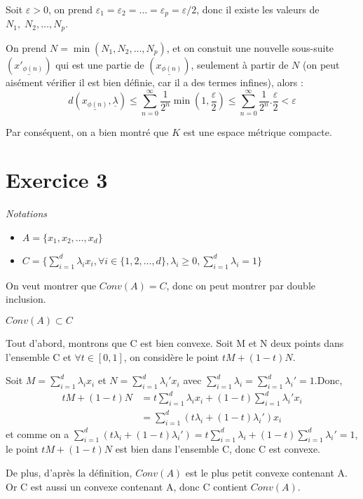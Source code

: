 \documentclass{article}
\begin{document}
Soit $\varepsilon >0$, on prend  $\varepsilon_1 = \varepsilon_2 = \ldots = \varepsilon_p = \varepsilon / 2$, donc il existe les valeurs de  $N_1, \; N_2, \ldots, N_p$.

On prend $N = \min(N_1, N_2, \ldots, N_p)$, et on constuit une nouvelle sous-suite $\left( \underline{x'_{\phi(n)}} \right)$ qui est une partie de $(\underline{x_{\phi(n)}})$, seulement à partir de $N$ (on peut aisément vérifier il est bien définie, car il a des termes infines), alors :
\[
d(\underline{x_{\phi(n)}}, \underline{\lambda}) \le \sum_{n=0}^{\infty} \frac{1}{2^n} \min (1, \frac{\varepsilon}{2} ) \le  \sum_{n=0}^{\infty} \frac{1}{2^n}  . \frac{\varepsilon}{2} < \varepsilon
\]

Par conséquent, on a bien montré que $K$ est une espace métrique compacte.
\newpage

\section{Exercice 3}
\textit{Notations}

\begin{itemize}
    \item $A=\{x_{1},x_{2},\dots, x_{d}\}$
    \item $C=\{\sum\limits_{i=1}^{d}\lambda_{i}x_{i}, \forall i \in \{1,2,\dots,d\},\lambda_{i}\geq0,\sum\limits_{i=1}^{d}\lambda_{i}=1\}$

\end{itemize}
On veut montrer que $Conv(A)=C$, donc on peut montrer par double inclusion.\par
\vspace{2em}
\textbf{\Large{$Conv(A)\subset C$}}\\
\par
Tout d'abord, montrons que C est bien convexe.
Soit M et N deux points dans l'ensemble C et $\forall t \in [0,1]$, on considère le point $tM+(1-t)N$.\par
Soit $M=\sum\limits_{i=1}^{d}\lambda_{i}x_{i}$ et $N=\sum\limits_{i=1}^{d}\lambda_{i}'x_{i}$ avec $\sum\limits_{i=1}^{d}\lambda_{i}=\sum\limits_{i=1}^{d}\lambda_{i}'=1$.Donc,
\begin{equation}
\begin{aligned}
tM+(1-t)N&=t\sum\limits_{i=1}^{d}\lambda_{i}x_{i}+(1-t)\sum\limits_{i=1}^{d}\lambda_{i}'x_{i}\\
&=\sum\limits_{i=1}^{d}(t\lambda_{i}+(1-t)\lambda_{i}')x_{i}
\end{aligned}\nonumber
\end{equation}
\hspace{2em}et comme on a $\sum\limits_{i=1}^{d}(t\lambda_{i}+(1-t)\lambda_{i}')=t\sum\limits_{i=1}^{d}\lambda_{i}+(1-t)\sum\limits_{i=1}^{d}\lambda_{i}'=1$, le point $tM+(1-t)N$ est bien dans l'ensemble C, donc C est convexe.\par
De plus, d'après la définition, $Conv(A)$ est le plus petit convexe contenant A. Or C est aussi un convexe contenant A, donc C contient $Conv(A)$.\\
\end{document}
